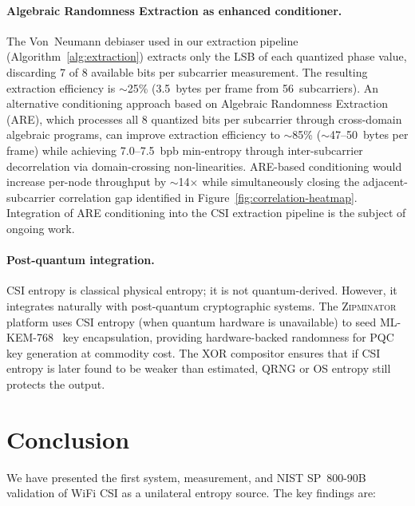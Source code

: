 \documentclass[sigconf,nonacm=false]{acmart}
\newcommand{\zipminator}{\textsc{Zipminator}\xspace}
\begin{document}
\paragraph{Algebraic Randomness Extraction as enhanced conditioner.}
The Von~Neumann debiaser used in our extraction pipeline (Algorithm~\ref{alg:extraction}) extracts only the LSB of each quantized phase value, discarding 7 of 8 available bits per subcarrier measurement.
The resulting extraction efficiency is $\sim$25\% (3.5~bytes per frame from 56~subcarriers).
An alternative conditioning approach based on Algebraic Randomness Extraction (ARE), which processes all 8 quantized bits per subcarrier through cross-domain algebraic programs, can improve extraction efficiency to $\sim$85\% ($\sim$47--50~bytes per frame) while achieving 7.0--7.5~bpb min-entropy through inter-subcarrier decorrelation via domain-crossing non-linearities.
ARE-based conditioning would increase per-node throughput by $\sim$14$\times$ while simultaneously closing the adjacent-subcarrier correlation gap identified in Figure~\ref{fig:correlation-heatmap}.
Integration of ARE conditioning into the CSI extraction pipeline is the subject of ongoing work.

\paragraph{Post-quantum integration.}
CSI entropy is classical physical entropy; it is not quantum-derived.
However, it integrates naturally with post-quantum cryptographic systems.
The \zipminator platform uses CSI entropy (when quantum hardware is unavailable) to seed ML-KEM-768~\cite{nist2024fips203} key encapsulation, providing hardware-backed randomness for PQC key generation at commodity cost.
The XOR compositor ensures that if CSI entropy is later found to be weaker than estimated, QRNG or OS entropy still protects the output.


\section{Conclusion}
\label{sec:conclusion}

We have presented the first system, measurement, and NIST SP~800-90B validation of WiFi CSI as a unilateral entropy source.
The key findings are:
\end{document}

